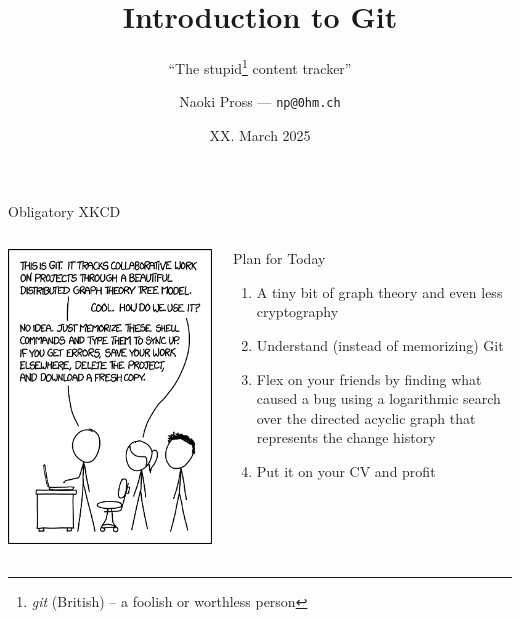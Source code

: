 \documentclass[xetex, handout]{beamer}
\title{
  Introduction to Git
}
\subtitle{
  ``The stupid\footnote{
    \emph{git} (British) -- a foolish or worthless person}
  content tracker''
}
\author{
  Naoki Pross --- \texttt{np@0hm.ch}
}
\institute{}
\date{XX. March 2025}
\begin{document}
\frame{\titlepage}

\begin{frame}{Obligatory XKCD}
  \begin{columns}
    \begin{column}{.5\linewidth}
      \includegraphics[width=\linewidth]{pic/xkcd1597}
    \end{column}
    \begin{column}{.5\linewidth}
      \begin{alertblock}{Plan for Today}
        \begin{enumerate}
          \item A tiny bit of graph theory and even less cryptography
          \item Understand (instead of memorizing) Git
          \item Flex on your friends by finding what caused a bug using a
            logarithmic search over the directed acyclic graph that represents
            the change history
          \item Put it on your CV and profit
        \end{enumerate}
      \end{alertblock}
    \end{column}
  \end{columns}
\end{frame}
\end{document}
